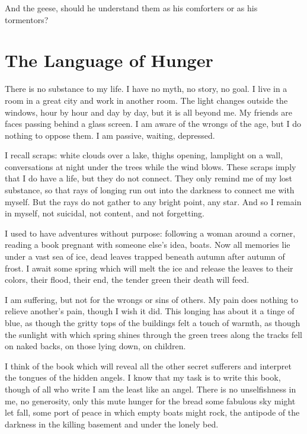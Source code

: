 \documentclass[english,11pt,letterpaper,onecolumn]{scrbook}
\begin{document}
	And the geese, should he understand them as his comforters or as his tormentors?

\newpage
\section{The Language of Hunger}
	There is no substance to my life.  I have no myth, no story, no goal.  I live in a room in a great city and work in another room.  The light changes outside the windows, hour by hour and day by day, but it is all beyond me.  My friends are faces passing behind a glass screen.  I am aware of the wrongs of the age, but I do nothing to oppose them.  I am passive, waiting, depressed.

	I recall scraps:  white clouds over a lake, thighs opening, lamplight on a wall, conversations at night under the trees while the wind blows.  These scraps imply that I do have a life, but they do not connect.  They only remind me of my lost substance, so that rays of longing run out into the darkness to connect me with myself.  But the rays do not gather to any bright point, any star.  And so I remain in myself, not suicidal, not content, and not forgetting.

	I used to have adventures without purpose:  following a woman around a corner, reading a book pregnant with someone else's idea, boats.  Now all memories lie under a vast sea of ice, dead leaves trapped beneath autumn after autumn of frost.  I await some spring which will melt the ice and release the leaves to their colors, their flood, their end, the tender green their death will feed.

	I am suffering, but not for the wrongs or sins of others.  My pain does nothing to relieve another's pain, though I wish it did.  This longing has about it a tinge of blue, as though the gritty tops of the buildings felt a touch of warmth, as though the sunlight with which spring shines through the green trees along the tracks fell on naked backs, on those lying down, on children.

	I think of the book which will reveal all the other secret sufferers and interpret the tongues of the hidden angels.  I know that my task is to write this book, though of all who write I am the least like an angel.  There is no unselfishness in me, no generosity, only this mute hunger for the bread some fabulous sky might let fall, some port of peace in which empty boats might rock, the antipode of the darkness in the killing basement and under the lonely bed.
\end{document}
